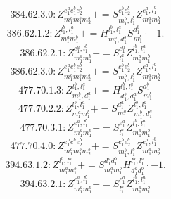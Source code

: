 \documentclass[letterpaper,10pt,fleqn,leqno,onecolumn]{article}
\begin{document}
\begin{equation} \;\;\;\;\;\;  384.62.3.0: Z^{e_{1}^{a}e_{1}^{b}e_{2}^{b}}_{m_{1}^{a}m_{1}^{b}m_{2}^{b}}+=S^{e_{1}^{b}e_{2}^{b}}_{m_{1}^{b},l_{1}^{b}}Z^{e_{1}^{a},l_{1}^{b}}_{m_{1}^{a}m_{2}^{b}} \end{equation}
\begin{equation} \;\;\;\;\;\;  386.62.1.2: Z^{l_{1}^{b},l_{1}^{a}}_{m_{1}^{a}m_{1}^{b}}+=H^{l_{1}^{b},l_{1}^{a}}_{m_{1}^{a},d_{1}^{b}}S^{d_{1}^{b}}_{m_{1}^{b}}\cdot -1. \end{equation}
\begin{equation} \;\;\;\;\;\;  386.62.2.1: Z^{e_{1}^{a},l_{1}^{b}}_{m_{1}^{a}m_{1}^{b}}+=S^{e_{1}^{a}}_{l_{1}^{a}}Z^{l_{1}^{b},l_{1}^{a}}_{m_{1}^{a}m_{1}^{b}} \end{equation}
\begin{equation} \;\;\;\;\;\;  386.62.3.0: Z^{e_{1}^{a}e_{1}^{b}e_{2}^{b}}_{m_{1}^{a}m_{1}^{b}m_{2}^{b}}+=S^{e_{1}^{b}e_{2}^{b}}_{m_{1}^{b},l_{1}^{b}}Z^{e_{1}^{a},l_{1}^{b}}_{m_{1}^{a}m_{2}^{b}} \end{equation}
\begin{equation} \;\;\;\;\;\;  477.70.1.3: Z^{l_{1}^{b},l_{1}^{a}}_{m_{1}^{b},d_{1}^{a}}+=H^{l_{1}^{b},l_{1}^{a}}_{d_{1}^{b},d_{1}^{a}}S^{d_{1}^{b}}_{m_{1}^{b}} \end{equation}
\begin{equation} \;\;\;\;\;\;  477.70.2.2: Z^{l_{1}^{b},l_{1}^{a}}_{m_{1}^{a}m_{1}^{b}}+=S^{d_{1}^{a}}_{m_{1}^{a}}Z^{l_{1}^{b},l_{1}^{a}}_{m_{1}^{b},d_{1}^{a}} \end{equation}
\begin{equation} \;\;\;\;\;\;  477.70.3.1: Z^{e_{1}^{a},l_{1}^{b}}_{m_{1}^{a}m_{1}^{b}}+=S^{e_{1}^{a}}_{l_{1}^{a}}Z^{l_{1}^{b},l_{1}^{a}}_{m_{1}^{a}m_{1}^{b}} \end{equation}
\begin{equation} \;\;\;\;\;\;  477.70.4.0: Z^{e_{1}^{a}e_{1}^{b}e_{2}^{b}}_{m_{1}^{a}m_{1}^{b}m_{2}^{b}}+=S^{e_{1}^{b}e_{2}^{b}}_{m_{1}^{b},l_{1}^{b}}Z^{e_{1}^{a},l_{1}^{b}}_{m_{1}^{a}m_{2}^{b}} \end{equation}
\begin{equation} \;\;\;\;\;\;  394.63.1.2: Z^{l_{1}^{b},l_{1}^{a}}_{m_{1}^{a}m_{1}^{b}}+=S^{d_{1}^{a}d_{1}^{b}}_{m_{1}^{a}m_{1}^{b}}H^{l_{1}^{b},l_{1}^{a}}_{d_{1}^{a}d_{1}^{b}}\cdot -1. \end{equation}
\begin{equation} \;\;\;\;\;\;  394.63.2.1: Z^{e_{1}^{a},l_{1}^{b}}_{m_{1}^{a}m_{1}^{b}}+=S^{e_{1}^{a}}_{l_{1}^{a}}Z^{l_{1}^{b},l_{1}^{a}}_{m_{1}^{a}m_{1}^{b}} \end{equation}
\end{document}
